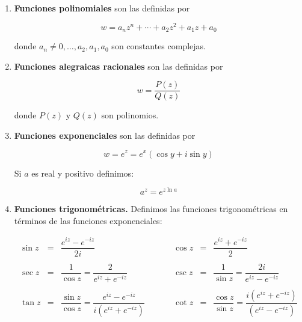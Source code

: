 \documentclass[12pt,a4paper]{book}
\begin{document}
\begin{enumerate}

\item \textbf{Funciones polinomiales} son las definidas por

\begin{equation}
w = a_n z^n + \cdots + a_2 z^2 + a_1 z + a_0
\end{equation}

donde $a_n \neq 0, \ldots, a_2, a_1, a_0$ son constantes complejas.

\item \textbf{Funciones alegraicas racionales} son las definidas por 

\begin{equation}
w  = \dfrac{P(z)}{Q(z)}
\end{equation}

donde $P(z)$ y $Q(z)$ son polinomios.

\item \textbf{Funciones exponenciales} son las definidas por 

\begin{equation}
w = e^z = e^x (\cos y + i \sin y)
\end{equation}

Si $a$ es real y positivo definimos:

\begin{equation}
a^z = e^{z \ln a}
\end{equation}

\item \textbf{Funciones trigonométricas.} Definimos las funciones trigonométricas en términos de las funciones exponenciales:

\begin{equation}
\begin{array}{cclccclc}

\sin z & = & \dfrac{e^{iz}-e^{-iz}}{2i} & \ \ \ \ \ \ \ \ & \cos z & = & \dfrac{e^{iz} + e^{-iz}}{2} \\ \\

\sec z & = & \dfrac{1}{\cos z} = \dfrac{2}{e^{iz}+e^{-iz}} & \ & \csc z& = & \dfrac{1}{\sin z} = \dfrac{2i}{e^{iz}-e^{-iz}} \\ \\

\tan z & = & \dfrac{\sin z}{\cos z} = \dfrac{e^{iz}-e^{-iz} }{i (e^{iz}+e^{-iz})} & & \cot z & = & \dfrac{\cos z}{\sin z} = \dfrac{i(e^{iz}+e^{-iz})}{(e^{iz}-e^{-iz})} 

\end{array}
\end{equation}


\end{enumerate}
\end{document}
